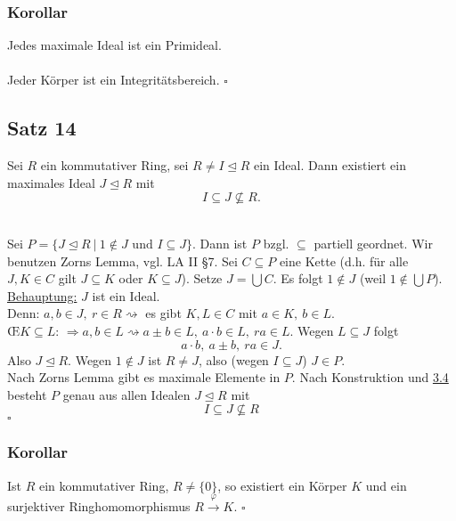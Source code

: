 \subsubsection*{Korollar}
Jedes maximale Ideal ist ein Primideal.\\

\\
Jeder Körper ist ein Integritätsbereich.
\hfill $\square$

\subsection{Satz 14}
\label{sub:satz_14}
Sei $R$ ein kommutativer Ring, sei $R\neq I\trianglelefteq R$ ein Ideal.
Dann existiert ein maximales Ideal $J\trianglelefteq R$ mit 
\[
I\subseteq J\nsubseteq R.
\]

\\
Sei $P=\{J\trianglelefteq R~|~1\notin J\text{ und }I\subseteq J \}$.
Dann ist $P$ bzgl. $\subseteq$ partiell geordnet.
Wir benutzen Zorns Lemma, vgl. LA II §7.
Sei $C\subseteq P$ eine Kette (d.h. für alle $J,K\in C$ gilt $J\subseteq K$ oder $K\subseteq J$).
Setze $J=\bigcup C$.
Es folgt $1\notin J$ (weil $1\notin \bigcup P$).\\
\uline{Behauptung:} $J$ ist ein Ideal.\\
Denn: $a,b\in J,~r\in R\rightsquigarrow$ es gibt $K,L\in C$ mit $a\in K,~b\in L$.\\
\OE $K\subseteq L$: $\Rightarrow a,b\in L\rightsquigarrow a\pm b\in L,~a\cdot b\in L,~ra\in L$.
Wegen $L\subseteq J$ folgt
\[
a\cdot b,~a\pm b,~ ra\in J.
\]
Also $J\trianglelefteq R$.
Wegen $1\notin J$ ist $R\neq J$, also (wegen $I\subseteq J$) $J\in P$.\\
Nach Zorns Lemma gibt es maximale Elemente in $P$.
Nach Konstruktion und \hyperref[sub:homomor_ideale]{3.4} besteht $P$ genau aus allen Idealen $J\trianglelefteq R$ mit
\[
I\subseteq J\nsubseteq R
\]
\hfill $\square$

\subsubsection*{Korollar}
Ist $R$ ein kommutativer Ring, $R\neq \{0\}$, so existiert ein Körper $K$ und ein surjektiver Ringhomomorphismus $R\stackrel{\varphi}{\to}K$.
\hfill $\square$

